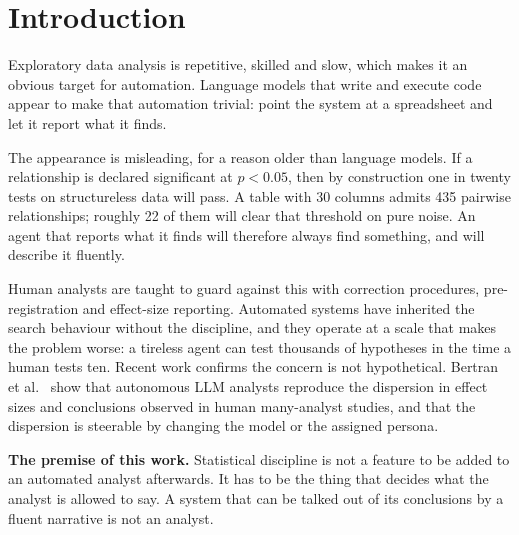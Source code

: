 \documentclass[10pt,twocolumn]{article}
\newcommand{\phead}[1]{\smallskip\noindent\textbf{#1.}\hspace{0.6em}\ignorespaces}
\begin{document}
\section{Introduction}

Exploratory data analysis is repetitive, skilled and slow, which makes it an
obvious target for automation. Language models that write and execute code
appear to make that automation trivial: point the system at a spreadsheet and
let it report what it finds.

The appearance is misleading, for a reason older than language models. If a
relationship is declared significant at $p < 0.05$, then by construction one in
twenty tests on structureless data will pass. A table with 30 columns admits
435 pairwise relationships; roughly 22 of them will clear that threshold on pure
noise. An agent that reports what it finds will therefore always find something,
and will describe it fluently.

Human analysts are taught to guard against this with correction procedures,
pre-registration and effect-size reporting. Automated systems have inherited the
search behaviour without the discipline, and they operate at a scale that makes
the problem worse: a tireless agent can test thousands of hypotheses in the time
a human tests ten. Recent work confirms the concern is not hypothetical.
Bertran et al.~\cite{bertran2026many} show that autonomous LLM analysts
reproduce the dispersion in effect sizes and conclusions observed in human
many-analyst studies, and that the dispersion is steerable by changing the
model or the assigned persona.

\phead{The premise of this work} Statistical discipline is not a feature to
be added to an automated analyst afterwards. It has to be the thing that decides
what the analyst is allowed to say. A system that can be talked out of its
conclusions by a fluent narrative is not an analyst.
\end{document}
